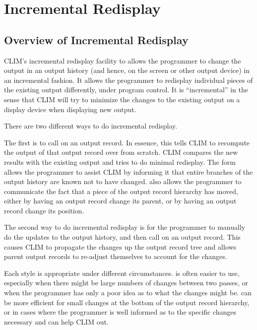 
\chapter {Incremental Redisplay}
\label {incremental-redisplay}

\section {Overview of Incremental Redisplay}

CLIM's incremental redisplay facility to allows the programmer to change the
output in an output history (and hence, on the screen or other output device) in
an incremental fashion.  It allows the programmer to redisplay individual pieces
of the existing output differently, under program control.  It is
``incremental'' in the sense that CLIM will try to minimize the changes to the
existing output on a display device when displaying new output.

There are two different ways to do incremental redisplay.

The first is to call  on an output record.  In essence, this tells
CLIM to recompute the output of that output record over from scratch.  CLIM
compares the new results with the existing output and tries to do minimal
redisplay.  The  form allows the programmer to assist CLIM
by informing it that entire branches of the output history are known not to have
changed.   also allows the programmer to communicate the
fact that a piece of the output record hierarchy has moved, either by having an
output record change its parent, or by having an output record change its
position.

The second way to do incremental redisplay is for the programmer to manually do the
updates to the output history, and then call 
on an output record.  This causes CLIM to propagate the changes up the output
record tree and allows parent output records to re-adjust themselves to account for
the changes.

Each style is appropriate under different circumstances.   is
often easier to use, especially when there might be large numbers of changes
between two passes, or when the programmer has only a poor idea as to what the
changes might be.   can be more efficient
for small changes at the bottom of the output record hierarchy, or in cases
where the programmer is well informed as to the specific changes necessary and
can help CLIM out.


